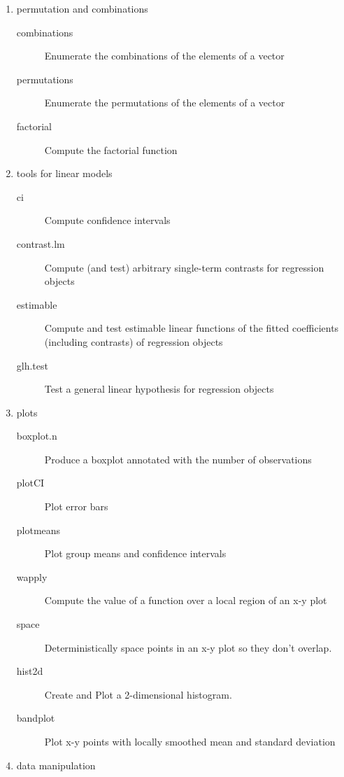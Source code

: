\documentclass{report}
\begin{document}
\begin{enumerate}


\item{permutation and combinations}

\begin{description}
\item[combinations]{ Enumerate the combinations of the elements of a vector}
\item[permutations]{ Enumerate the permutations of the elements of a vector}
\item[factorial]{ Compute the factorial function}
\end{description}

\item{tools for linear models}

\begin{description}
\item[ci]{ Compute confidence intervals}
\item[contrast.lm]{ Compute (and test) arbitrary single-term     
        contrasts for regression objects}       
\item[estimable]{ Compute and test estimable linear functions of
         the fitted coefficients (including contrasts) of regression objects}
\item[glh.test]{ Test a general linear hypothesis for regression objects}

\end{description}

\item{plots}
\begin{description}
\item[boxplot.n]{Produce a boxplot annotated with the number of observations}
\item[plotCI]{ Plot error bars}
\item[plotmeans]{ Plot group means and confidence intervals}
\item[wapply]{ Compute the value of a function over a local region of
    an x-y plot}
\item[space]{ Deterministically space points in an x-y plot so they don't
 overlap.}
\item[hist2d]{ Create and Plot a 2-dimensional histogram.}
\item[bandplot] {Plot x-y points with locally smoothed mean and standard deviation}

\end{description}

\item{data manipulation}


\end{enumerate}
\end{document}

